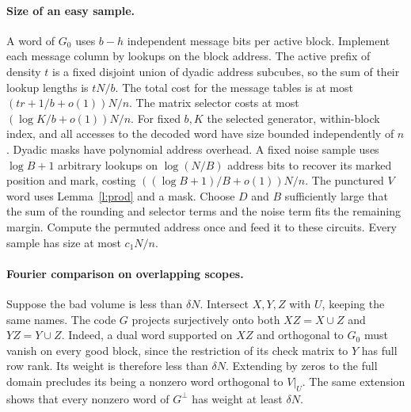 \documentclass[11pt]{article}
\begin{document}
\paragraph{Size of an easy sample.}
A word of $G_0$ uses $b-h$ independent message bits per active block. Implement each message column by lookups on the block address. The active prefix of density $t$ is a fixed disjoint union of dyadic address subcubes, so the sum of their lookup lengths is $tN/b$. The total cost for the message tables is at most $(tr+1/b+o(1))N/n$. The matrix selector costs at most $(\log K/b+o(1))N/n$. For fixed $b,K$ the selected generator, within-block index, and all accesses to the decoded word have size bounded independently of $n$. Dyadic masks have polynomial address overhead. A fixed noise sample uses $\log B+1$ arbitrary lookups on $\log(N/B)$ address bits to recover its marked position and mark, costing $((\log B+1)/B+o(1))N/n$. The punctured $V$ word uses Lemma~\ref{l:prod} and a mask. Choose $D$ and $B$ sufficiently large that the sum of the rounding and selector terms and the noise term fits the remaining margin. Compute the permuted address once and feed it to these circuits. Every sample has size at most $c_1N/n$.

\paragraph{Fourier comparison on overlapping scopes.}
Suppose the bad volume is less than $\delta N$. Intersect $X,Y,Z$ with $U$, keeping the same names. The code $G$ projects surjectively onto both $XZ=X\cup Z$ and $YZ=Y\cup Z$. Indeed, a dual word supported on $XZ$ and orthogonal to $G_0$ must vanish on every good block, since the restriction of its check matrix to $Y$ has full row rank. Its weight is therefore less than $\delta N$. Extending by zeros to the full domain precludes its being a nonzero word orthogonal to $V|_U$. The same extension shows that every nonzero word of $G^\perp$ has weight at least $\delta N$.
\end{document}
